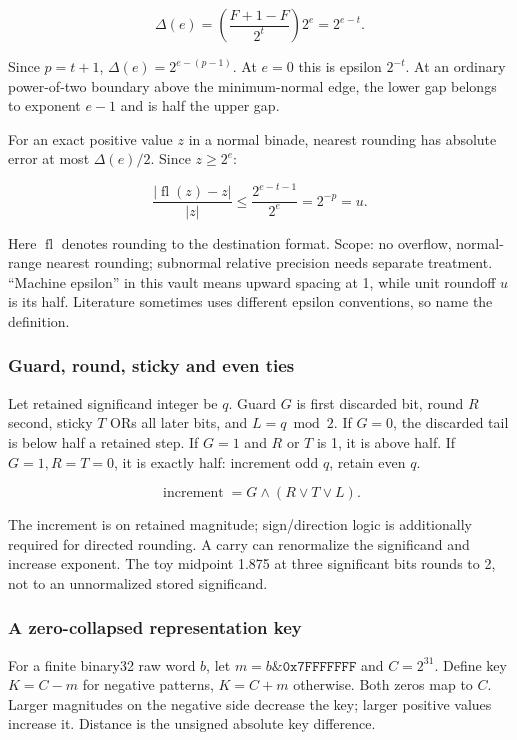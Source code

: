 \[
\Delta(e)=\left(\frac{F+1-F}{2^t}\right)2^e=2^{e-t}.
\]

Since \(p=t+1\), \(\Delta(e)=2^{e-(p-1)}\). At \(e=0\) this is epsilon \(2^{-t}\). At an ordinary power-of-two boundary above the minimum-normal edge, the lower gap belongs to exponent \(e-1\) and is half the upper gap.

For an exact positive value \(z\) in a normal binade, nearest rounding has absolute error at most \(\Delta(e)/2\). Since \(z\ge2^e\):

\[
\frac{|\operatorname{fl}(z)-z|}{|z|}
\le\frac{2^{e-t-1}}{2^e}=2^{-p}=u.
\]

Here \(\operatorname{fl}\) denotes rounding to the destination format. Scope: no overflow, normal-range nearest rounding; subnormal relative precision needs separate treatment. ``Machine epsilon'' in this vault means upward spacing at 1, while unit roundoff \(u\) is its half. Literature sometimes uses different epsilon conventions, so name the definition.

\subsubsection{Guard, round, sticky and even ties}\label{guard-round-sticky-and-even-ties}

Let retained significand integer be \(q\). Guard \(G\) is first discarded bit, round \(R\) second, sticky \(T\) ORs all later bits, and \(L=q\bmod2\). If \(G=0\), the discarded tail is below half a retained step. If \(G=1\) and \(R\) or \(T\) is 1, it is above half. If \(G=1,R=T=0\), it is exactly half: increment odd \(q\), retain even \(q\).

\[
\operatorname{increment}=G\land(R\lor T\lor L).
\]

The increment is on retained magnitude; sign/direction logic is additionally required for directed rounding. A carry can renormalize the significand and increase exponent. The toy midpoint 1.875 at three significant bits rounds to 2, not to an unnormalized stored significand.

\subsubsection{A zero-collapsed representation key}\label{a-zero-collapsed-representation-key}

For a finite binary32 raw word \(b\), let \(m=b\mathbin{\&}\texttt{0x7FFFFFFF}\) and \(C=2^{31}\). Define key \(K=C-m\) for negative patterns, \(K=C+m\) otherwise. Both zeros map to \(C\). Larger magnitudes on the negative side decrease the key; larger positive values increase it. Distance is the unsigned absolute key difference.

